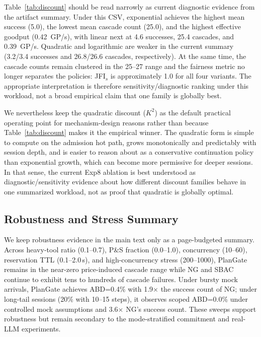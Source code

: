 \documentclass[sigconf,review,anonymous]{acmart}
\begin{document}
Table~\ref{tab:discount} should be read narrowly as current diagnostic evidence from the artifact summary. Under this CSV, exponential achieves the highest mean success (5.0), the lowest mean cascade count (25.0), and the highest effective goodput (0.42~GP/s), with linear next at 4.6 successes, 25.4 cascades, and 0.39~GP/s. Quadratic and logarithmic are weaker in the current summary (3.2/3.4 successes and 26.8/26.6 cascades, respectively). At the same time, the cascade counts remain clustered in the 25--27 range and the fairness metric no longer separates the policies: JFI$_s$ is approximately 1.0 for all four variants. The appropriate interpretation is therefore sensitivity/diagnostic ranking under this workload, not a broad empirical claim that one family is globally best.

We nevertheless keep the quadratic discount ($K^2$) as the default practical operating point for mechanism-design reasons rather than because Table~\ref{tab:discount} makes it the empirical winner. The quadratic form is simple to compute on the admission hot path, grows monotonically and predictably with session depth, and is easier to reason about as a conservative continuation policy than exponential growth, which can become more permissive for deeper sessions. In that sense, the current Exp8 ablation is best understood as diagnostic/sensitivity evidence about how different discount families behave in one summarized workload, not as proof that quadratic is globally optimal. 
\subsection{Robustness and Stress Summary}
\label{sec:sensitivity_main}
\label{sec:sensitivity}
\label{sec:concsens}
\label{sec:scalestress}
\label{sec:bursty_longtail}

We keep robustness evidence in the main text only as a page-budgeted summary. Across heavy-tool ratio (0.1--0.7), P\&S fraction (0.0--1.0), concurrency (10--60), reservation TTL (0.1--2.0\,s), and high-concurrency stress (200--1000), PlanGate remains in the near-zero price-induced cascade range while NG and SBAC continue to exhibit tens to hundreds of cascade failures. Under bursty mock arrivals, PlanGate achieves ABD=0.4\% with 1.9$\times$ the success count of NG; under long-tail sessions (20\% with 10--15 steps), it observes scoped ABD=0.0\% under controlled mock assumptions and 3.6$\times$ NG's success count. These sweeps support robustness but remain secondary to the mode-stratified commitment and real-LLM experiments.
\end{document}
